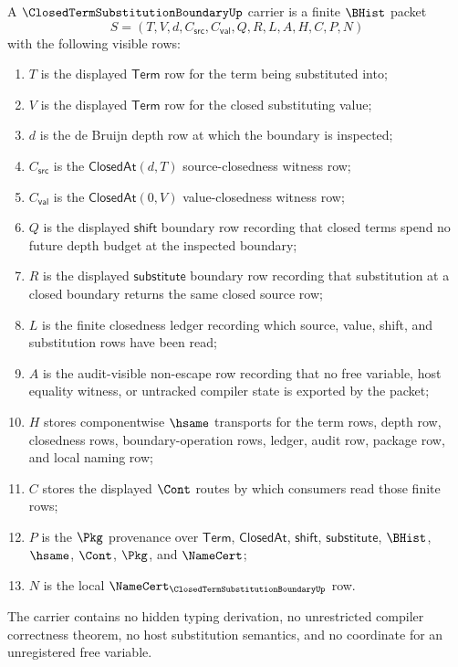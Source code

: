 \begin{definition}
\label{def:closed-term-substitution-boundary-carrier}
A $\ClosedTermSubstitutionBoundaryUp$ carrier is a finite $\BHist$ packet
$$
S=(T,V,d,C_{\mathsf{src}},C_{\mathsf{val}},Q,R,L,A,H,C,P,N)
$$
with the following visible rows:
\begin{enumerate}
\item $T$ is the displayed $\mathsf{Term}$ row for the term being substituted into;
\item $V$ is the displayed $\mathsf{Term}$ row for the closed substituting value;
\item $d$ is the de Bruijn depth row at which the boundary is inspected;
\item $C_{\mathsf{src}}$ is the $\mathsf{ClosedAt}(d,T)$ source-closedness witness row;
\item $C_{\mathsf{val}}$ is the $\mathsf{ClosedAt}(0,V)$ value-closedness witness row;
\item $Q$ is the displayed $\mathsf{shift}$ boundary row recording that closed terms spend no future depth budget at the inspected boundary;
\item $R$ is the displayed $\mathsf{substitute}$ boundary row recording that substitution at a closed boundary returns the same closed source row;
\item $L$ is the finite closedness ledger recording which source, value, shift, and substitution rows have been read;
\item $A$ is the audit-visible non-escape row recording that no free variable, host equality witness, or untracked compiler state is exported by the packet;
\item $H$ stores componentwise $\hsame$ transports for the term rows, depth row, closedness rows, boundary-operation rows, ledger, audit row, package row, and local naming row;
\item $C$ stores the displayed $\Cont$ routes by which consumers read those finite rows;
\item $P$ is the $\Pkg$ provenance over $\mathsf{Term}$, $\mathsf{ClosedAt}$, $\mathsf{shift}$, $\mathsf{substitute}$, $\BHist$, $\hsame$, $\Cont$, $\Pkg$, and $\NameCert$;
\item $N$ is the local $\NameCert_{\ClosedTermSubstitutionBoundaryUp}$ row.
\end{enumerate}
The carrier contains no hidden typing derivation, no unrestricted compiler correctness theorem, no host substitution semantics, and no coordinate for an unregistered free variable.
\end{definition}

